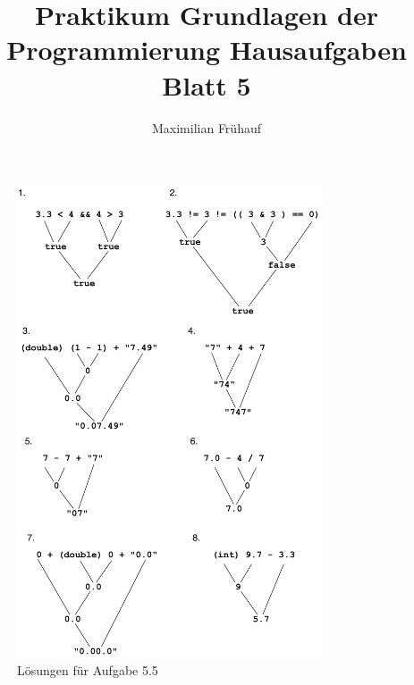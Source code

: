 \documentclass[a4paper, 10pt]{article}
\title{Praktikum Grundlagen der Programmierung Hausaufgaben Blatt 5}
\author{Maximilian Frühauf}
\begin{document}
\maketitle
\begin{figure}[htpb]
	\centering
    \includegraphics[width=9cm, height=\textheight, keepaspectratio]{Blatt5Solutions}
	\caption{Lösungen für Aufgabe 5.5}
\end{figure}
\end{document}
